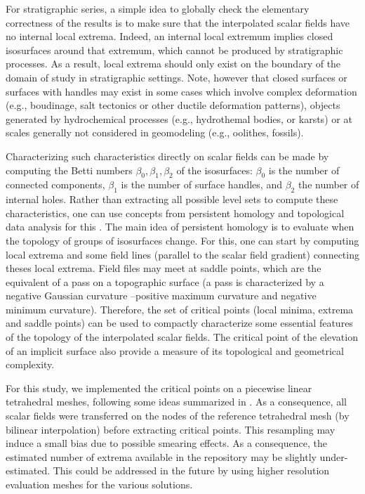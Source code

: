 \documentclass[preprint]{ring20}
\begin{document}
For stratigraphic series, a simple idea to globally check the elementary correctness of the results is to make sure that the interpolated scalar fields have no internal local extrema. Indeed, an internal local extremum implies closed isosurfaces around that extremum, which cannot be produced by stratigraphic processes. As a result, local extrema should only exist on the boundary of the domain of study in stratigraphic settings. Note, however that closed surfaces or surfaces with handles may exist in some cases which involve complex deformation (e.g., boudinage, salt tectonics or other ductile deformation patterns), objects generated by hydrochemical processes (e.g., hydrothemal bodies, or karsts) or at scales generally not considered in geomodeling (e.g., oolithes, fossils). 

Characterizing such characteristics directly on scalar fields can be made by computing the Betti numbers $\beta_0, \beta_1, \beta_2$ of the isosurfaces: $\beta_0$ is the number of connected components, $\beta_1$ is the number of surface handles, and $\beta_2$ the number of internal holes. Rather than extracting all possible level sets to compute these characteristics, one can use concepts from persistent homology and topological data analysis for this \citep[e.g.,][]{Chazal2017ACMS,Tierny2017,Wasserman2018}. The main idea of persistent homology is to evaluate when the topology of groups of isosurfaces change. For this, one can start by computing local extrema and some field lines (parallel to the scalar field gradient) connecting theses local extrema. Field files may meet at saddle points, which are the equivalent of a pass on a topographic surface (a pass is characterized by a negative Gaussian curvature --positive maximum curvature and negative minimum curvature). Therefore, the set of critical points (local minima, extrema and saddle points) can be used to compactly characterize some essential features of the topology of the interpolated scalar fields. The critical point of the elevation of an implicit surface also provide a measure of its topological and geometrical complexity. 

For this study, we implemented the critical points on a piecewise linear tetrahedral meshes, following some ideas summarized in \citet{Tierny2017}. As a consequence, all scalar fields were transferred on the nodes of the reference tetrahedral mesh (by bilinear interpolation) before extracting critical points. This resampling may induce a small bias due to possible smearing effects. As a consequence, the estimated number of extrema available in the repository may be slightly under-estimated. 
This could be addressed in the future by using higher resolution evaluation meshes for the various solutions. 
\end{document}

